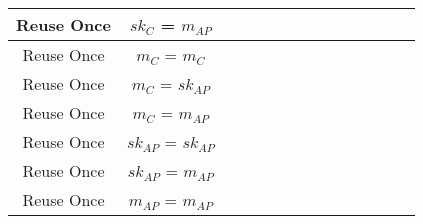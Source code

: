 \documentclass[crop]{standalone}
\newcommand{\noattack}{\color{ForestGreen}\usym{2713}\color{black}}
\newcommand{\attack}{\color{red}\usym{2717}\color{black}}
\begin{document}
{\begin{tabular}{|c|c|c|c|c|c|c|c|c|c|c|c|c|c|}
Reuse Once & $sk_C$ = $m_{AP}$ & \noattack & \attack & \noattack & \attack & \noattack & \attack & \noattack & \attack & \noattack & \noattack & \noattack & \attack\\ \hline
Reuse Once & $m_C$ = $m_C$ & \noattack & \attack & \noattack & \attack & \noattack & \attack & \noattack & \attack & \noattack & \noattack & \noattack & \attack\\ \hline
Reuse Once & $m_C$ = $sk_{AP}$ & \noattack & \attack & \noattack & \attack & \noattack & \attack & \noattack & \attack & \noattack & \noattack & \noattack & \attack\\ \hline
Reuse Once & $m_C$ = $m_{AP}$ & \noattack & \attack & \noattack & \attack & \noattack & \attack & \noattack & \attack & \noattack & \noattack & \noattack & \attack\\ \hline
Reuse Once & $sk_{AP}$ = $sk_{AP}$ & \noattack & \attack & \noattack & \attack & \noattack & \attack & \noattack & \attack & \noattack & \noattack & \noattack & \attack\\ \hline
Reuse Once & $sk_{AP}$ = $m_{AP}$ & \noattack & \attack & \noattack & \attack & \noattack & \attack & \noattack & \attack & \noattack & \noattack & \noattack & \attack\\ \hline
Reuse Once & $m_{AP}$ = $m_{AP}$ & \noattack & \attack & \noattack & \attack & \noattack & \attack & \noattack & \attack & \noattack & \noattack & \noattack & \attack\\ \hline
\end{tabular}}
\end{document}
